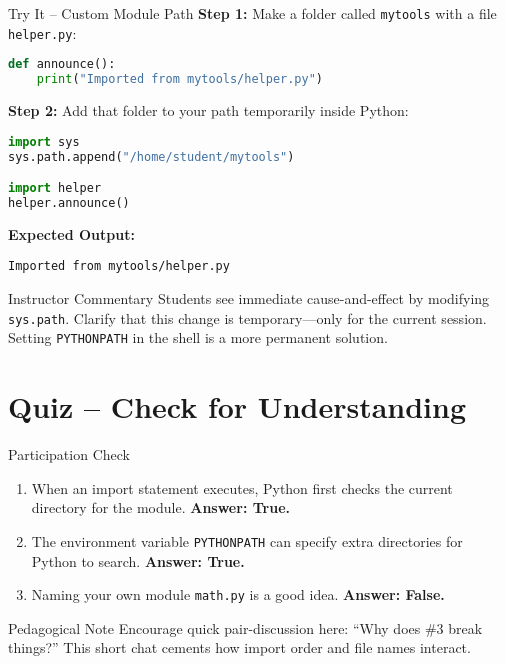 \documentclass[12pt]{article}
\begin{document}
\begin{activitybox}{Try It – Custom Module Path}
\textbf{Step 1:} Make a folder called \texttt{mytools} with a file \texttt{helper.py}:

\begin{lstlisting}[language=Python]
def announce():
    print("Imported from mytools/helper.py")
\end{lstlisting}

\textbf{Step 2:} Add that folder to your path temporarily inside Python:
\begin{lstlisting}[language=Python]
import sys
sys.path.append("/home/student/mytools")

import helper
helper.announce()
\end{lstlisting}

\textbf{Expected Output:}
\begin{lstlisting}
Imported from mytools/helper.py
\end{lstlisting}
\end{activitybox}

\begin{teacherbox}{Instructor Commentary}
Students see immediate cause-and-effect by modifying \texttt{sys.path}.  
Clarify that this change is temporary—only for the current session.  
Setting \texttt{PYTHONPATH} in the shell is a more permanent solution.
\end{teacherbox}

\section{Quiz – Check for Understanding}

\begin{activitybox}{Participation Check}
\begin{enumerate}
  \item When an import statement executes, Python first checks the current directory for the module.  
        \textbf{Answer: True.}
  \item The environment variable \texttt{PYTHONPATH} can specify extra directories for Python to search.  
        \textbf{Answer: True.}
  \item Naming your own module \texttt{math.py} is a good idea.  
        \textbf{Answer: False.}
\end{enumerate}
\end{activitybox}

\begin{teacherbox}{Pedagogical Note}
Encourage quick pair-discussion here: “Why does \#3 break things?”  
This short chat cements how import order and file names interact.
\end{teacherbox}
\end{document}
